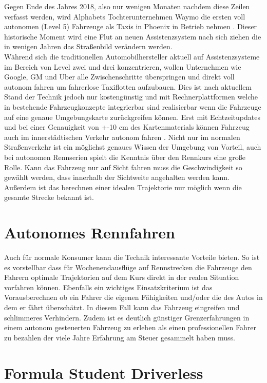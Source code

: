 \documentclass{like}
\begin{document}
Gegen Ende des Jahres 2018, also nur wenigen Monaten nachdem diese Zeilen verfasst werden, wird Alphabets Tochterunternehmen Waymo die ersten voll autonomen (Level 5) Fahrzeuge als Taxis in Phoenix in Betrieb nehmen \cite{Waymo}. Dieser historische Moment wird eine Flut an neuen Assistenzsystem nach sich ziehen die in wenigen Jahren das Straßenbild verändern werden. \\
Während sich die traditionellen Automobilhersteller aktuell auf Assistenzsysteme im Bereich von Level zwei und drei konzentrieren, wollen Unternehmen wie Google, GM und Uber alle Zwischenschritte überspringen und direkt voll autonom fahren um fahrerlose Taxiflotten aufzubauen. Dies ist nach aktuellem Stand der Technik jedoch nur kostengünstig und mit Rechnerplattformen welche in bestehende Fahrzeugkonzepte integrierbar sind realisierbar wenn die Fahrzeuge auf eine genaue Umgebungskarte zurückgreifen können. Erst mit Echtzeitupdates und bei einer Genauigkeit von +-10 cm des Kartenmaterials können Fahrzeug auch im innerstädtischen Verkehr autonom fahren \cite{SEIF2016159}. 
Nicht nur im normalen Straßenverkehr ist ein möglichst genaues Wissen der Umgebung von Vorteil, auch bei autonomen Rennserien spielt die Kenntnis über den Rennkurs eine große Rolle. Kann das Fahrzeug nur auf Sicht fahren muss die Geschwindigkeit so gewählt werden, dass innerhalb der Sichtweite angehalten werden kann. Außerdem ist das berechnen einer idealen Trajektorie nur möglich wenn die gesamte Strecke bekannt ist.

\section{Autonomes Rennfahren}


Auch für normale Konsumer kann die Technik interessante Vorteile bieten. So ist es vorstellbar dass für Wochenendausflüge auf Rennstrecken die Fahrzeuge den Fahrern optimale Trajektorien auf dem Kurs direkt in der realen Situation vorfahren können. Ebenfalls ein wichtiges Einsatzkriterium ist das Vorausberechnen ob ein Fahrer die eigenen Fähigkeiten und/oder die des Autos in dem er fährt überschätzt. In diesem Fall kann das Fahrzeug eingreifen und schlimmeres Verhindern. Zudem ist es deutlich günstiger Grenzerfahrungen in einem autonom gesteuerten Fahrzeug zu erleben als einen professionellen Fahrer zu bezahlen der viele Jahre Erfahrung am Steuer gesammelt haben muss.

\section{Formula Student Driverless}
\end{document}
